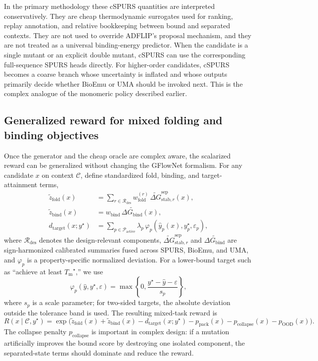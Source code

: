 \documentclass[11pt]{article}
\newcommand{\Tm}{\ensuremath{T_{\mathrm m}}}
\newcommand{\DGbind}{\ensuremath{\Delta G_{\mathrm{bind}}}}
\begin{document}
In the primary methodology these cSPURS quantities are interpreted conservatively. They are cheap thermodynamic surrogates used for ranking, replay annotation, and relative bookkeeping between bound and separated contexts. They are not used to override ADFLIP's proposal mechanism, and they are not treated as a universal binding-energy predictor. When the candidate is a single mutant or an explicit double mutant, cSPURS can use the corresponding full-sequence SPURS heads directly. For higher-order candidates, cSPURS becomes a coarse branch whose uncertainty is inflated and whose outputs primarily decide whether BioEmu or UMA should be invoked next. This is the complex analogue of the monomeric policy described earlier.


\subsection{Generalized reward for mixed folding and binding objectives}

Once the generator and the cheap oracle are complex aware, the scalarized reward can be generalized without changing the GFlowNet formalism. For any candidate $x$ on context $\mathcal{C}$, define standardized fold, binding, and target-attainment terms,
\begin{align}
    \tilde z_{\mathrm{fold}}(x) &= \sum_{r\in\mathcal{R}_{\mathrm{des}}} w^{(r)}_{\mathrm{fold}}\,\widetilde{\Delta G}^{\mathrm{sep}}_{\mathrm{stab},r}(x),\\
    \tilde z_{\mathrm{bind}}(x) &= w_{\mathrm{bind}}\,\widetilde{\DGbind}(x),\\
    d_{\mathrm{target}}(x;y^\star) &= \sum_{p\in\mathcal{P}_{\mathrm{active}}} \lambda_p\,\varphi_p\!\left(\hat y_p(x),y_p^\star,\varepsilon_p\right),
\end{align}
where $\mathcal{R}_{\mathrm{des}}$ denotes the design-relevant components, $\widetilde{\Delta G}^{\mathrm{sep}}_{\mathrm{stab},r}$ and $\widetilde{\DGbind}$ are sign-harmonized calibrated summaries fused across SPURS, BioEmu, and UMA, and $\varphi_p$ is a property-specific normalized deviation. For a lower-bound target such as ``achieve at least $\Tm^\star$,'' we use
\begin{equation}
    \varphi_p(\hat y,y^\star,\varepsilon)=\max\!\left\{0,\frac{y^\star-\hat y-\varepsilon}{s_p}\right\},
\end{equation}
where $s_p$ is a scale parameter; for two-sided targets, the absolute deviation outside the tolerance band is used. The resulting mixed-task reward is
\begin{equation}
\label{eq:complexreward_v11}
    R(x\mid\mathcal{C},y^\star)=\exp\Big(\tilde z_{\mathrm{fold}}(x)+\tilde z_{\mathrm{bind}}(x)-d_{\mathrm{target}}(x;y^\star)-p_{\mathrm{pack}}(x)-p_{\mathrm{collapse}}(x)-p_{\mathrm{OOD}}(x)\Big).
\end{equation}
The collapse penalty $p_{\mathrm{collapse}}$ is important in complex design: if a mutation artificially improves the bound score by destroying one isolated component, the separated-state terms should dominate and reduce the reward.
\end{document}
